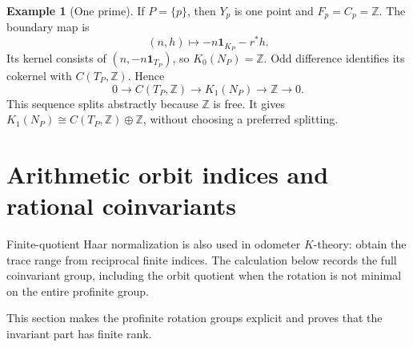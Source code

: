 \documentclass[11pt]{article}
\newcommand{\Z}{\mathbb Z}
\newcommand{\one}{\mathbf 1}
\theoremstyle{definition}
\newtheorem{example}[theorem]{Example}
\theoremstyle{remark}
\begin{document}
\begin{example}[One prime]\label{ex:oneprime}
If $P=\{p\}$, then $Y_p$ is one point and $F_p=C_p=\Z$. The boundary map is
\[
 (n,h)\longmapsto-n\one_{K_P}-r^*h.
\]
Its kernel consists of $(n,-n\one_{T_P})$, so $K_0(N_P)=\Z$. Odd difference identifies its cokernel with $C(T_P,\Z)$. Hence
\[
 0\longrightarrow C(T_P,\Z)\longrightarrow K_1(N_P)
 \longrightarrow\Z\longrightarrow0.
\]
This sequence splits abstractly because $\Z$ is free. It gives $K_1(N_P)\cong C(T_P,\Z)\oplus\Z$, without choosing a preferred splitting.
\end{example}

\section{Arithmetic orbit indices and rational coinvariants}\label{sec:arithmetic}

Finite-quotient Haar normalization is also used in odometer $K$-theory: \citet[Proposition 4.10, pp.~34--35]{GPW} obtain the trace range from reciprocal finite indices. The calculation below records the full coinvariant group, including the orbit quotient when the rotation is not minimal on the entire profinite group.


This section makes the profinite rotation groups explicit and proves that the invariant part has finite rank.
\end{document}
